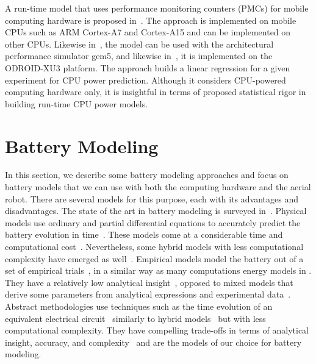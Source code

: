 A run-time model that uses performance monitoring counters (PMCs) for mobile computing hardware is proposed in~\citep{walker2017accurate}. The approach is implemented on mobile CPUs such as ARM Cortex-A7 and Cortex-A15 and can be implemented on other CPUs. Likewise in~\citep{reddy2017empirical}, the model can be used with the architectural performance simulator gem5, and likewise in~\citep{nunez2013enabling,nikov2015evaluation,reddy2017empirical}, it is implemented on the ODROID-XU3 platform. The approach builds a linear regression for a given experiment for CPU power prediction. Although it considers CPU-powered computing hardware only, it is insightful in terms of proposed statistical rigor in building run-time CPU power models.

\section{Battery Modeling}
\label{sec:soa-ene-bat}

In this section, we describe some battery modeling approaches and focus on battery models that we can use with both the computing hardware and the aerial robot. There are several models for this purpose, each with its advantages and disadvantages. The state of the art in battery modeling is surveyed in~\citep{rao2003battery}.
Physical models use ordinary and partial differential equations to accurately predict the battery evolution in time~\citep{rao2003battery}. These models come at a considerable time and computational cost~\citep{doyle1993modeling,marcicki2013design,lotfi2017reduced,moura2017battery}. Nevertheless, some hybrid models with less computational complexity have emerged as well~\citep{kim2011hybrid,kim2019enhanced}. Empirical models model the battery out of a set of empirical trials~\citep{syracuse1997statistical,pedram1999design}, in a similar way as many computations energy models in . They have a relatively low analytical insight~\citep{rao2003battery}, opposed to mixed models that derive some parameters from analytical expressions and experimental data~\citep{rao2003battery,rakhmatov2001analytical}. Abstract methodologies use techniques such as the time evolution of an equivalent electrical circuit~\citep{gold1997pspice,benini2001discrete,seongjun2008state,xiaosong2012comparative,xing2014state,hasan2018exogenous} similarly to hybrid models~\citep{kim2011hybrid} but with less computational complexity. They have compelling trade-offs in terms of analytical insight, accuracy, and complexity~\citep{rao2003battery} and are the models of our choice for battery modeling.

